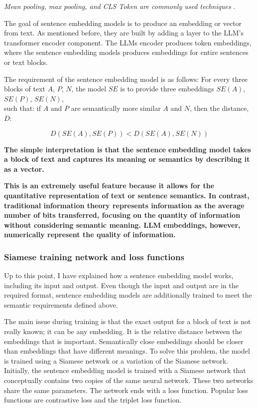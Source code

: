 \documentclass{wseas}
\begin{document}
\textit{Mean pooling, max pooling, and CLS Token are commonly used techniques} \cite{sbert}.

The goal of sentence embedding models is to produce an embedding or
vector from text. As mentioned before, they are built by adding a layer
to the LLM's transformer encoder component. The LLMs encoder produces token
embeddings, where the sentence embedding models produces embeddings for
entire sentences or text blocks.

The requirement of the sentence embedding model is as follows:
For every three blocks of text \(A\), \(P\), \(N\), the model \(SE\) is
to provide three embeddings \(SE(A)\), \(SE(P)\), \(SE(N)\),\\
such that: if \(A\) and \(P\) are semantically more similar \(A\) and
\(N\), then the distance, $D$: 

\begin{equation}
  D(SE(A), SE(P)) < D(SE(A), SE(N))
\end{equation}

\textbf{The simple interpretation is that the sentence embedding model
takes a block of text and captures its meaning or semantics by
describing it as a vector.}

\textbf{This is an extremely useful feature because it allows for the 
quantitative representation of text or sentence semantics. In contrast, 
traditional information theory represents information as the 
average number of bits transferred, focusing on the quantity of information 
without considering semantic meaning. LLM embeddings, however, numerically 
represent the quality of information.}

\subsubsection{Siamese training network and loss functions}

Up to this point, I have explained how a sentence embedding model works,
including its input and output. Even though the input and output are in
the required format, sentence embedding models are additionally trained
to meet the semantic requirements defined above.

The main issue during training is that the exact output for a block of
text is not really known; it can be any embedding. It is the relative 
distance between the embeddings that is important. Semantically close 
embeddings should be closer than embeddings that have different meanings. 
To solve this problem, the model is trained using a Siamese network or a
variation of the Siamese network. Initially, the sentence embedding model is
trained with a Siamese network that conceptually contains two copies of
the same neural network. These two networks share the same parameters.
The network ends with a loss function. Popular loss functions are
contrastive loss and the triplet loss function.
\end{document}

